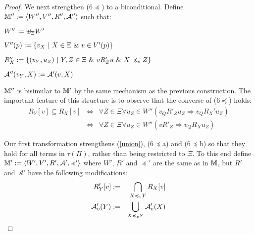 \begin{proof}
  
  
  We next strengthen (6$\preccurlyeq$) to a biconditional.  Define
  $\mathbbm{M}'' \assign \langle W'', V'', R'', \mathcal{A}'' \rangle$ such
  that:
  \begin{itemizedot}
    \item $W'' \assign \uplus_{\Xi} W'$
    
    \item $V'' (p) \assign \{v_X \  | \  X \in \Xi
    \  \& \  v \in V' (p)\}$
    
    \item $R''_X \assign \{(v_Y, u_Z) \  | \  Y, Z \in \Xi
    \  \& \  v R'_Z u \  \& \  X
    \preccurlyeq_v Z\}$
    
    \item $\mathcal{A}'' (v_Y, X) \assign \mathcal{A}' (v, X)$
  \end{itemizedot}
  $\mathbbm{M}''$ is bisimular to $\mathbbm{M}'$ by the same mechanism as the
  previous construction.  The important feature of this structure is to
  observe that the converse of (6$\preccurlyeq$) holds:
  \begin{eqnarray*}
    R_Y [v] \subseteq R_X [v] & \Longleftrightarrow & \forall Z \in \Xi
    \forall u_Z \in W'' (v_Q R'_Z u_Z \Longrightarrow v_Q R_X' u_Z)\\
    & \Longleftrightarrow & \forall Z \in \Xi \forall u_Z \in W'' (v R'_Z
    \Longrightarrow v_Q R_X u_Z)
  \end{eqnarray*}
  
  
  Our first transformation strengthens (\ref{union}), (6$\preccurlyeq$a) and
  (6$\preccurlyeq$b) so that they hold for all terms in $\tau (\Pi)$, rather
  than being restricted to $\Xi$.  To this end define $\mathbbm{M}' \assign
  \langle W', V', R', \mathcal{A}', \preccurlyeq' \rangle$ where $W'$, $R'$
  and $\preccurlyeq'$ are the same as in $\mathbbm{M}$, but $R'$ and
  $\mathcal{A}'$ have the following modifications:
  \begin{eqnarray}
    R'_Y [v] & \assign & \bigcap_{X \preccurlyeq_v Y} R_X [v] \nonumber\\
    \mathcal{A}'_v (Y) & \assign & \bigcup_{X \preccurlyeq_v Y} \mathcal{A}'_v
    (X) \nonumber
  \end{eqnarray}
  
\end{proof}
